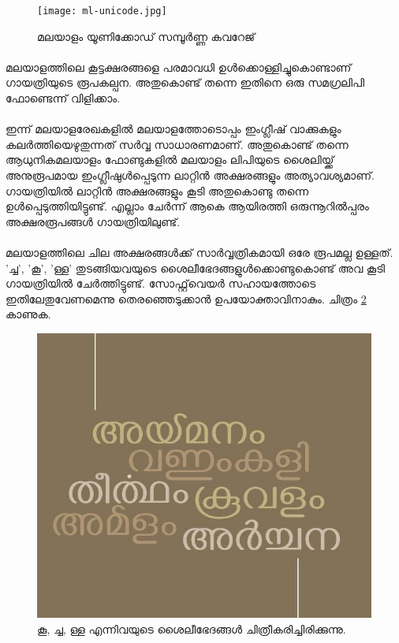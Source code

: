 \documentclass[a4paper, 12pt]{report}
\begin{document}
	\begin{figure}
		\begin{centering}
			\texttt{[image: ml-unicode.jpg]}
			\caption{മലയാളം യൂണിക്കോഡ് സമ്പൂര്‍ണ്ണ കവറേജ്}
			\label{unicode}
		\end{centering}
	\end{figure}
	
	\paragraph{}
	മലയാളത്തിലെ കൂട്ടക്ഷരങ്ങളെ പരമാവധി ഉള്‍ക്കൊള്ളിച്ചുകൊണ്ടാണ് ഗായത്രിയുടെ രൂപകല്പന‍. അതുകൊണ്ട് തന്നെ ഇതിനെ ഒരു സമഗ്രലിപി ഫോണ്ടെന്ന് വിളിക്കാം.
	
	\paragraph{}
	ഇന്ന് മലയാളരേഖകളില്‍ മലയാളത്തോടൊപ്പം ഇംഗ്ലീഷ് വാക്കുകളും കലര്‍ത്തിയെഴുതുന്നത് സര്‍വ്വ സാധാരണമാണ്. അതുകൊണ്ട് തന്നെ ആധുനികമലയാളം ഫോണ്ടുകളില്‍ മലയാളം ലിപിയുടെ ശൈലിയ്ക്ക് അനുരൂപമായ ഇംഗ്ലീഷുള്‍പ്പെടുന്ന ലാറ്റിന്‍ അക്ഷരങ്ങളും അത്യാവശ്യമാണ്. ഗായത്രിയിൽ ലാറ്റിന്‍ അക്ഷരങ്ങളും കൂടി അതുകൊണ്ടു തന്നെ ഉള്‍പ്പെടുത്തിയിട്ടുണ്ട്.  എല്ലാം ചേര്‍ന്ന് ആകെ ആയിരത്തി ഒരുന്നൂറിൽപ്പരം അക്ഷരരൂപങ്ങൾ‍ ഗായത്രിയിലുണ്ട്. 
	
	\paragraph{}
	മലയാളത്തിലെ ചില അക്ഷരങ്ങള്‍ക്ക് സാര്‍വ്വത്രികമായി ഒരേ രൂപമല്ല ഉള്ളത്. 'ച്ച', 'കൂ', 'ള്ള' തുടങ്ങിയവയുടെ ശൈലീഭേദങ്ങളുള്‍ക്കൊണ്ടുകൊണ്ട് അവ കൂടി ഗായത്രിയിൽ ചേര്‍ത്തിട്ടുണ്ട്. സോഫ്റ്റ്‌വെയര്‍ സഹായത്തോടെ ഇതിലേതുവേണമെന്നു തെരഞ്ഞെടുക്കാന്‍ ഉപയോക്താവിനാകും. ചിത്രം \ref{style} കാണുക. 
	‍ 
	\begin{figure}
		\begin{centering}
			\includegraphics[width=1.0\textwidth]{style.jpg}
			\caption{കൂ, ച്ച, ള്ള എന്നിവയുടെ ശൈലീഭേദങ്ങൾ ചിത്രീകരിച്ചിരിക്കുന്നു.}
			\label{style}
		\end{centering}
	\end{figure}
	
\end{document}
